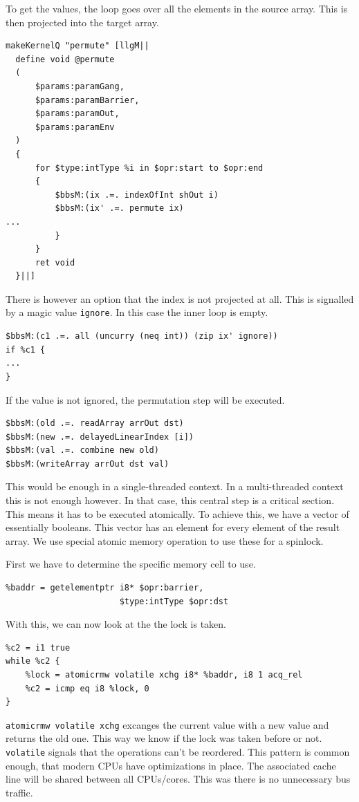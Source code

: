 \documentclass[a4paper,bibliography=totocnumbered,parskip,headsepline]{scrbook}
\begin{document}
To get the values, the loop goes over all the elements in the source array.
This is then projected into the target array.
\begin{lstlisting}
makeKernelQ "permute" [llgM||
  define void @permute
  (
      $params:paramGang,
      $params:paramBarrier,
      $params:paramOut,
      $params:paramEnv
  )
  {
      for $type:intType %i in $opr:start to $opr:end
      {
          $bbsM:(ix .=. indexOfInt shOut i)
          $bbsM:(ix' .=. permute ix)
...
          }
      }
      ret void
  }||]
\end{lstlisting}
There is however an option that the index is not projected at all.
This is signalled by a magic value \lstinline[language=haskell]!ignore!.
In this case the inner loop is empty.
\begin{lstlisting}
$bbsM:(c1 .=. all (uncurry (neq int)) (zip ix' ignore))
if %c1 {
...
}
\end{lstlisting}
If the value is not ignored, the permutation step will be executed.
\begin{lstlisting}
$bbsM:(old .=. readArray arrOut dst)
$bbsM:(new .=. delayedLinearIndex [i])
$bbsM:(val .=. combine new old)
$bbsM:(writeArray arrOut dst val)
\end{lstlisting}
This would be enough in a single-threaded context.
In a multi-threaded context this is not enough however.
In that case, this central step is a critical section.
This means it has to be executed atomically.
To achieve this, we have a vector of essentially booleans.
This vector has an element for every element of the result array.
We use special atomic memory operation to use these for a spinlock.

First we have to determine the specific memory cell to use.
\begin{lstlisting}
%baddr = getelementptr i8* $opr:barrier,
                       $type:intType $opr:dst
\end{lstlisting}
With this, we can now look at the the lock is taken.
\begin{lstlisting}
%c2 = i1 true
while %c2 {
    %lock = atomicrmw volatile xchg i8* %baddr, i8 1 acq_rel
    %c2 = icmp eq i8 %lock, 0
}
\end{lstlisting}
\lstinline!atomicrmw volatile xchg! excanges the current value with a new value and returns the old one.
This way we know if the lock was taken before or not.
\lstinline!volatile! signals that the operations can't be reordered.
This pattern is common enough, that modern CPUs have optimizations in place.
The associated cache line will be shared between all CPUs/cores.
This was there is no unnecessary bus traffic.
\end{document}
